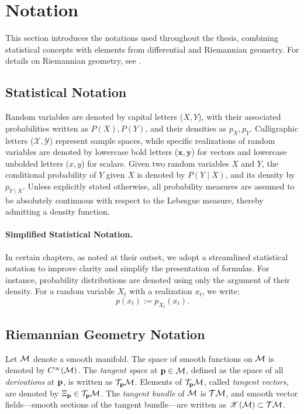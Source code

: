 
\section*{Notation}
\label{sec:notation}

This section introduces the notations used throughout the thesis, combining statistical concepts with elements from differential and Riemannian geometry. For details on Riemannian geometry, see \cite{boothby2003introduction,carmo1992riemannian,lee2013smooth,sakai1996riemannian}.

\subsection*{Statistical Notation}
Random variables are denoted by capital letters (\(X, Y\)), with their associated probabilities written as \(P(X), P(Y)\), and their densities as \(p_X, p_Y\). Calligraphic letters (\(\mathcal{X}, \mathcal{Y}\)) represent sample spaces, while specific realizations of random variables are denoted by lowercase bold letters (\(\mathbf{x}, \mathbf{y}\)) for vectors and lowercase unbolded letters (\(x, y\)) for scalars. Given two random variables \(X\) and \(Y\), the conditional probability of \(Y\) given \(X\) is denoted by \(P(Y \mid X)\), and its density by \(p_{Y \mid X}\). Unless explicitly stated otherwise, all probability measures are assumed to be absolutely continuous with respect to the Lebesgue measure, thereby admitting a density function.

\paragraph{Simplified Statistical Notation.}  
In certain chapters, as noted at their outset, we adopt a streamlined statistical notation to improve clarity and simplify the presentation of formulas. For instance, probability distributions are denoted using only the argument of their density. For a random variable \(X_t\) with a realization \(x_t\), we write:  
\[
p(x_t) := p_{X_t}(x_t).
\]

\subsection*{Riemannian Geometry Notation}
Let \(\mathcal{M}\) denote a smooth manifold. The space of smooth functions on \(\mathcal{M}\) is denoted by \(C^\infty(\mathcal{M})\). The \emph{tangent space} at \(\mathbf{p} \in \mathcal{M}\), defined as the space of all \emph{derivations} at \(\mathbf{p}\), is written as \(\mathcal{T}_{\mathbf{p}} \mathcal{M}\). Elements of \(\mathcal{T}_{\mathbf{p}} \mathcal{M}\), called \emph{tangent vectors}, are denoted by \(\Xi_{\mathbf{p}} \in \mathcal{T}_{\mathbf{p}} \mathcal{M}\). The \emph{tangent bundle} of \(\mathcal{M}\) is \(\mathcal{T} \mathcal{M}\), and smooth vector fields—smooth sections of the tangent bundle—are written as \(\mathscr{X}(\mathcal{M}) \subset \mathcal{T} \mathcal{M}\).

